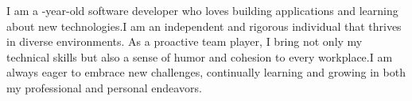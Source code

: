 
\begin{FlushLeft} %
\myJustification
I am a \myAgeFloor-year-old software developer who loves building applications and learning about new technologies.I am an independent and rigorous individual that thrives in diverse environments. As a proactive team player, I bring not only my technical skills but also a sense of humor and cohesion to every workplace.I am always eager to embrace new challenges, continually learning and growing in both my professional and personal endeavors.
\end{FlushLeft}